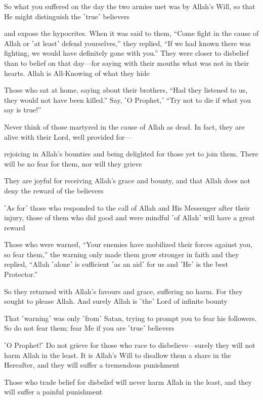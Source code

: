 So what you suffered on the day the two armies met was by Allah’s Will, so that He might distinguish the ˹true˺ believers

and expose the hypocrites. When it was said to them, “Come fight in the cause of Allah or ˹at least˺ defend yourselves,” they replied, “If we had known there was fighting, we would have definitely gone with you.” They were closer to disbelief than to belief on that day—for saying with their mouths what was not in their hearts. Allah is All-Knowing of what they hide

Those who sat at home, saying about their brothers, “Had they listened to us, they would not have been killed.” Say, ˹O Prophet,˺ “Try not to die if what you say is true!”

Never think of those martyred in the cause of Allah as dead. In fact, they are alive with their Lord, well provided for—

rejoicing in Allah’s bounties and being delighted for those yet to join them. There will be no fear for them, nor will they grieve

They are joyful for receiving Allah’s grace and bounty, and that Allah does not deny the reward of the believers

˹As for˺ those who responded to the call of Allah and His Messenger after their injury, those of them who did good and were mindful ˹of Allah˺ will have a great reward

Those who were warned, “Your enemies have mobilized their forces against you, so fear them,” the warning only made them grow stronger in faith and they replied, “Allah ˹alone˺ is sufficient ˹as an aid˺ for us and ˹He˺ is the best Protector.”

So they returned with Allah’s favours and grace, suffering no harm. For they sought to please Allah. And surely Allah is ˹the˺ Lord of infinite bounty

That ˹warning˺ was only ˹from˺ Satan, trying to prompt you to fear his followers. So do not fear them; fear Me if you are ˹true˺ believers

˹O Prophet!˺ Do not grieve for those who race to disbelieve—surely they will not harm Allah in the least. It is Allah’s Will to disallow them a share in the Hereafter, and they will suffer a tremendous punishment

Those who trade belief for disbelief will never harm Allah in the least, and they will suffer a painful punishment

